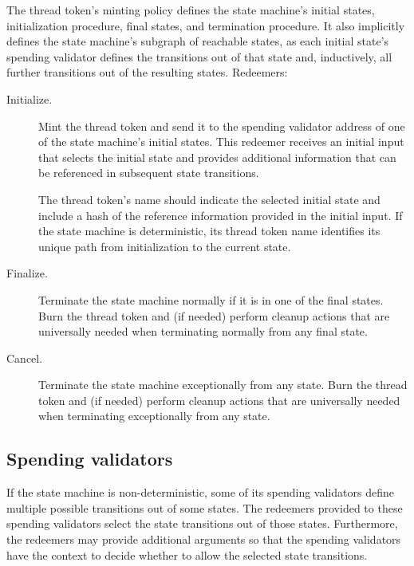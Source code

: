 \documentclass[../midgard.tex]{subfiles}
\begin{document}
The thread token's minting policy defines the state machine's initial states, initialization procedure, final states, and termination procedure.
It also implicitly defines the state machine's subgraph of reachable states, as each initial state's spending validator defines the transitions out of that state and, inductively, all further transitions out of the resulting states.
Redeemers:

\begin{description}
    \item[Initialize.] Mint the thread token and send it to the spending validator address of one of the state machine's initial states.
      This redeemer receives an initial input that selects the initial state and provides additional information that can be referenced in subsequent state transitions.
    
    The thread token's name should indicate the selected initial state and include a hash of the reference information provided in the initial input.
    If the state machine is deterministic, its thread token name identifies its unique path from initialization to the current state.
    
    \item[Finalize.] Terminate the state machine normally if it is in one of the final states.
      Burn the thread token and (if needed) perform cleanup actions that are universally needed when terminating normally from any final state.
    
    \item[Cancel.] Terminate the state machine exceptionally from any state.
      Burn the thread token and (if needed) perform cleanup actions that are universally needed when terminating exceptionally from any state.
\end{description}

\subsection{Spending validators}
\label{h:single-threaded-state-machine-spending-validators}

If the state machine is non-deterministic, some of its spending validators define multiple possible transitions out of some states.
The redeemers provided to these spending validators select the state transitions out of those states.
Furthermore, the redeemers may provide additional arguments so that the spending validators have the context to decide whether to allow the selected state transitions.
\end{document}

